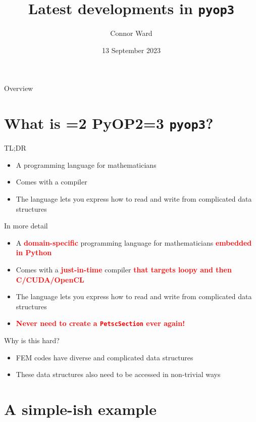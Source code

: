 \documentclass[aspectratio=169]{beamer}
\title{Latest developments in \texttt{pyop3}}
\author{Connor Ward}
\date{13 September 2023}
\def\pyop#1{\ifnum#1=2 {PyOP2}\else \ifnum#1=3 {\texttt{pyop3}}\fi \fi}
\newcommand{\myred}[1]{\textcolor{red}{\textbf{#1}}}
\begin{document}
\frame{\titlepage}

\begin{frame}{Overview}
  \tableofcontents
\end{frame}

\section{What is \pyop3?}

\begin{frame}{TL;DR}
  \begin{itemize}
    \item A programming language for mathematicians
    \item Comes with a compiler
    \item The language lets you express how to read and write from complicated data structures
  \end{itemize}

  \vfill
\end{frame}

\begin{frame}{In more detail}
  \begin{itemize}
    \item A \myred{domain-specific} programming language for mathematicians \myred{embedded in Python}
    \item Comes with a \myred{just-in-time} compiler \myred{that targets loopy and then C/CUDA/OpenCL}
    \item The language lets you express how to read and write from complicated data structures
    \item \myred{Never need to create a \texttt{PetscSection} ever again!}
  \end{itemize}

  \vfill
\end{frame}

\begin{frame}{Why is this hard?}
  \begin{itemize}
    \item FEM codes have diverse and complicated data structures
    \item These data structures also need to be accessed in non-trivial ways
  \end{itemize}
\end{frame}

\section{A simple-ish example}
\end{document}
